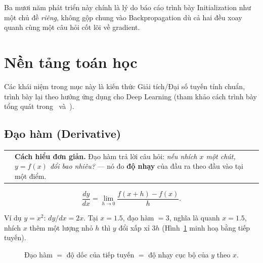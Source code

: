 \documentclass[12pt,a4paper]{article}
\makeatletter
\newenvironment{tructiep}[1][Cách hiểu đơn giản]
  {\par\smallskip\noindent\begin{tabular}{@{}p{0.35em}@{\hspace{6pt}}p{\dimexpr\linewidth-1.9em\relax}@{}}
   \textcolor{boxln}{\rule{2pt}{\baselineskip}} & \textbf{#1.}\enspace\ignorespaces}
  {\end{tabular}\par\smallskip}
\makeatother
\begin{document}
Ba mươi năm phát triển này chính là lý do báo cáo trình bày Initialization
như một chủ đề \emph{riêng}, không gộp chung vào Backpropagation dù cả
hai đều xoay quanh cùng một câu hỏi cốt lõi về gradient.

\section{Nền tảng toán học}

Các khái niệm trong mục này là kiến thức Giải tích/Đại số tuyến tính chuẩn,
trình bày lại theo hướng ứng dụng cho Deep Learning (tham khảo cách trình
bày tổng quát trong~\citet{bishop2006pattern} và~\citet{goodfellow2016deep}).

\subsection{Đạo hàm (Derivative)}

\begin{tructiep}
Đạo hàm trả lời câu hỏi: \emph{nếu nhích $x$ một chút, $y=f(x)$ đổi bao
nhiêu?} --- nó đo \textbf{độ nhạy} của đầu ra theo đầu vào tại một điểm.
\end{tructiep}

$$\frac{dy}{dx} = \lim_{h\to 0}\frac{f(x+h)-f(x)}{h}.$$

Ví dụ $y=x^2$: $dy/dx=2x$. Tại $x=1.5$, đạo hàm $=3$, nghĩa là quanh
$x=1.5$, nhích $x$ thêm một lượng nhỏ $h$ thì $y$ đổi xấp xỉ $3h$ (Hình~\ref{fig:deriv}
minh hoạ bằng tiếp tuyến).

\begin{figure}[htbp]
\centering
{}
\caption{Đạo hàm $=$ độ dốc của tiếp tuyến $=$ độ nhạy cục bộ của $y$ theo $x$.}
\label{fig:deriv}
\end{figure}
\end{document}

